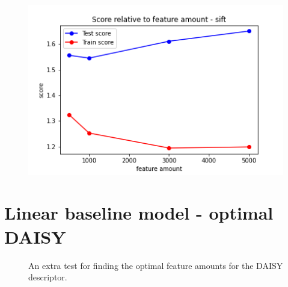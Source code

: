 \begin{figure}[H]
  \centering
  \begin{minipage}[b]{0.4\textwidth}
    \includegraphics[width=\textwidth]{images/2-LBM-feature_amount_sift_large_values.png}
  \end{minipage}
\end{figure}


\section*{Linear baseline model - optimal DAISY}

\begin{figure}[H]
    \captionsetup{width=0.85\linewidth}
    \captionsetup{justification=centering}
    \caption{An extra test for finding the optimal feature amounts for the DAISY descriptor.}
    \label{fig:2-LBM-feature_amount_daisy_daisy_optimal}
\end{figure}

